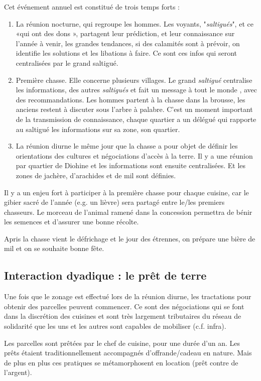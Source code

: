 Cet événement annuel est constitué de trois temps forts :
\begin{enumerate}
  \item La réunion nocturne, qui regroupe les hommes. Les voyants, "\textit{saltigués}", et ce «qui ont des dons », partagent leur prédiction, et leur connaissance sur l'année à venir, les grandes tendances, si des calamités sont à prévoir, on identifie les solutions et les libations à faire. Ce sont ces infos qui seront centralisées par le grand saltigué.
  \item Première chasse. Elle concerne plusieurs villages.  Le grand \textit{saltigué} centralise les informations, des autres \textit{saltigués} et fait un message à tout le monde , avec des recommandations. Les hommes partent à la chasse dans la brousse, les anciens restent à discuter sous l'arbre à palabre. C'est un moment important de la transmission de connaissance, chaque quartier a un délégué qui rapporte au saltigué les informations sur sa zone, son quartier.
  \item La réunion diurne le même jour que la chasse a pour objet de définir les orientations des cultures et négociations d'accès à la terre. Il y a une réunion par quartier de Diohine et les informations sont ensuite centralisées. Et les zones de jachère, d'arachides et de mil sont définies.
\end{enumerate}

Il y a un enjeu fort à participer à la première chasse pour chaque cuisine, car le gibier sacré de l'année (e.g. un lièvre) sera partagé entre le/les premiers chasseurs. Le morceau de l'animal ramené dans la concession permettra de bénir les semences et d'assurer une bonne récolte.

Apris la chasse vient le défrichage  et  le jour des étrennes, on prépare une bière de mil et on se souhaite bonne fête.


\subsection{Interaction dyadique : le prêt de terre}

Une fois que le zonage est effectué lors de la réunion diurne, les tractations pour obtenir des parcelles  peuvent commencer. Ce sont des négociations qui se font dans la discrétion des cuisines et sont très largement tributaires du réseau de solidarité que les uns et les autres sont capables de mobiliser (c.f. infra).

Les parcelles sont prêtées par le chef de cuisine, pour une durée d'un an. Les prêts étaient traditionnellement accompagnés d'offrande/cadeau en nature. Mais de plus en plus ces pratiques se métamorphosent en location (prêt contre de l'argent).

